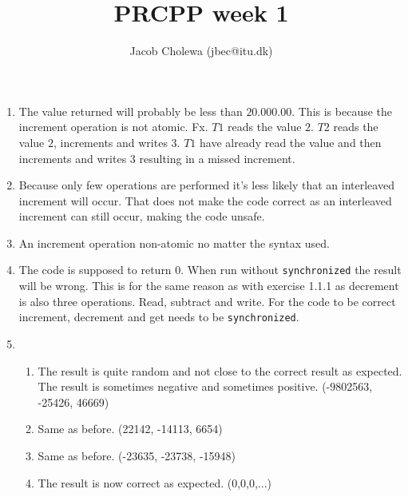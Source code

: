 \documentclass{tufte-handout}
\title{PRCPP week 1}
\author{Jacob Cholewa (jbec@itu.dk)}
\begin{document}
  \maketitle

  \section{}

  
  \subsection{} \label{subsec:e11}

  \begin{enumerate}
    \item The value returned will probably be less than $20.000.00$. This is because the increment operation is not atomic. Fx. $T1$ reads the value $2$. $T2$ reads the value $2$, increments and writes $3$. $T1$ have already read the value and then increments and writes $3$ resulting in a missed increment.

    \item Because only few operations are performed it's less likely that an interleaved increment will occur. That does not make the code correct as an interleaved increment can still occur, making the code unsafe.

    \item An increment operation non-atomic no matter the syntax used.

    \item The code is supposed to return 0. When run without \texttt{synchronized} the result will be wrong. This is for the same reason as with exercise 1.1.1 as decrement is also three operations. Read, subtract and write. For the code to be correct increment, decrement and get needs to be \texttt{synchronized}.

    \item
      \begin{enumerate}[i]
        \item The result is quite random and not close to the correct result as expected. The result is sometimes negative and sometimes positive. (-9802563, -25426, 46669)
        \item Same as before. (22142, -14113, 6654)
        \item Same as before. (-23635, -23738, -15948)
        \item The result is now correct as expected. (0,0,0,...)
      \end{enumerate}
  \end{enumerate}
\end{document}
